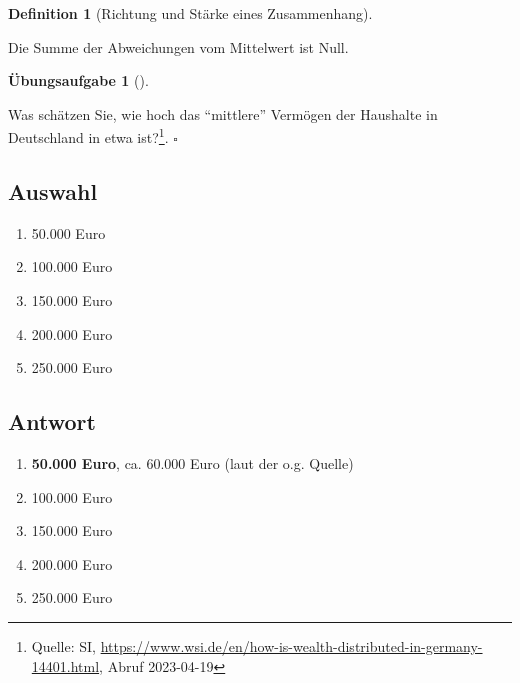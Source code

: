 \documentclass[
  a4paper,
  DIV=11]{scrreprt}
\providecommand{\tightlist}{%
  \setlength{\itemsep}{0pt}\setlength{\parskip}{0pt}}\usepackage{longtable,booktabs,array}
\theoremstyle{definition}
\newtheorem{exercise}{Übungsaufgabe}[chapter]
\theoremstyle{definition}
\theoremstyle{definition}
\newtheorem{definition}{Definition}[chapter]
\theoremstyle{remark}
\begin{document}
\begin{definition}[Richtung und Stärke eines
Zusammenhang]
\begin{tcolorbox}[enhanced jigsaw, leftrule=.75mm, opacitybacktitle=0.6, colback=white, colframe=quarto-callout-note-color-frame, coltitle=black, colbacktitle=quarto-callout-note-color!10!white, opacityback=0, left=2mm, breakable, titlerule=0mm, toptitle=1mm, bottomtitle=1mm, rightrule=.15mm, title=\textcolor{quarto-callout-note-color}{\faInfo}\hspace{0.5em}{Hinweis}, arc=.35mm, bottomrule=.15mm, toprule=.15mm]

Die Summe der Abweichungen vom Mittelwert ist Null.

\end{tcolorbox}

\begin{exercise}[]\protect\hypertarget{exr-mw-wealth1}{}\label{exr-mw-wealth1}

Was schätzen Sie, wie hoch das ``mittlere'' Vermögen der Haushalte in
Deutschland in etwa ist?\footnote{Quelle: SI,
  \url{https://www.wsi.de/en/how-is-wealth-distributed-in-germany-14401.html},
  Abruf 2023-04-19}. \(\square\)

\end{exercise}

\subsection{Auswahl}

\begin{enumerate}
\def\labelenumi{\alph{enumi})}
\tightlist
\item
  50.000 Euro
\item
  100.000 Euro
\item
  150.000 Euro
\item
  200.000 Euro
\item
  250.000 Euro
\end{enumerate}

\subsection{Antwort}

\begin{enumerate}
\def\labelenumi{\alph{enumi})}
\tightlist
\item
  \textbf{50.000 Euro}, ca. 60.000 Euro (laut der o.g. Quelle)
\item
  100.000 Euro
\item
  150.000 Euro
\item
  200.000 Euro
\item
  250.000 Euro
\end{enumerate}


\end{definition}
\end{document}
